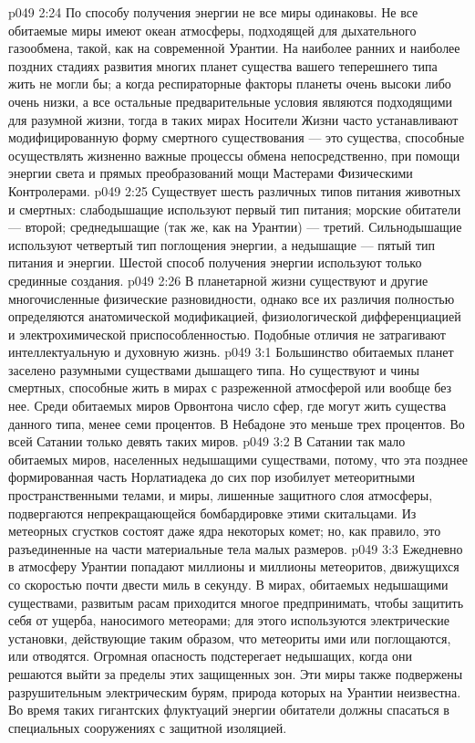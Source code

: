 \vs p049 2:24 \pc {}\bibnobreakspace {} По способу получения энергии не все миры одинаковы. Не все обитаемые миры имеют океан атмосферы, подходящей для дыхательного газообмена, такой, как на современной Урантии. На наиболее ранних и наиболее поздних стадиях развития многих планет существа вашего теперешнего типа жить не могли бы; а когда респираторные факторы планеты очень высоки либо очень низки, а все остальные предварительные условия являются подходящими для разумной жизни, тогда в таких мирах Носители Жизни часто устанавливают модифицированную форму смертного существования --- это существа, способные осуществлять жизненно важные процессы обмена непосредственно, при помощи энергии света и прямых преобразований мощи Мастерами Физическими Контролерами.
\vs p049 2:25 Существует шесть различных типов питания животных и смертных: слабодышащие используют первый тип питания; морские обитатели --- второй; среднедышащие (так же, как на Урантии) --- третий. Сильнодышащие используют четвертый тип поглощения энергии, а недышащие --- пятый тип питания и энергии. Шестой способ получения энергии используют только срединные создания.
\vs p049 2:26 \pc {}\bibnobreakspace {} В планетарной жизни существуют и другие многочисленные физические разновидности, однако все их различия полностью определяются анатомической модификацией, физиологической дифференциацией и электрохимической приспособленностью. Подобные отличия не затрагивают интеллектуальную и духовную жизнь.
\vs p049 3:1 Большинство обитаемых планет заселено разумными существами дышащего типа. Но существуют и чины смертных, способные жить в мирах с разреженной атмосферой или вообще без нее. Среди обитаемых миров Орвонтона число сфер, где могут жить существа данного типа, менее семи процентов. В Небадоне это меньше трех процентов. Во всей Сатании только девять таких миров.
\vs p049 3:2 В Сатании так мало обитаемых миров, населенных недышащими существами, потому, что эта позднее формированная часть Норлатиадека до сих пор изобилует метеоритными пространственными телами, и миры, лишенные защитного слоя атмосферы, подвергаются непрекращающейся бомбардировке этими скитальцами. Из метеорных сгустков состоят даже ядра некоторых комет; но, как правило, это разъединенные на части материальные тела малых размеров.
\vs p049 3:3 Ежедневно в атмосферу Урантии попадают миллионы и миллионы метеоритов, движущихся со скоростью почти двести миль в секунду. В мирах, обитаемых недышащими существами, развитым расам приходится многое предпринимать, чтобы защитить себя от ущерба, наносимого метеорами; для этого используются электрические установки, действующие таким образом, что метеориты ими или поглощаются, или отводятся. Огромная опасность подстерегает недышащих, когда они решаются выйти за пределы этих защищенных зон. Эти миры также подвержены разрушительным электрическим бурям, природа которых на Урантии неизвестна. Во время таких гигантских флуктуаций энергии обитатели должны спасаться в специальных сооружениях с защитной изоляцией.

